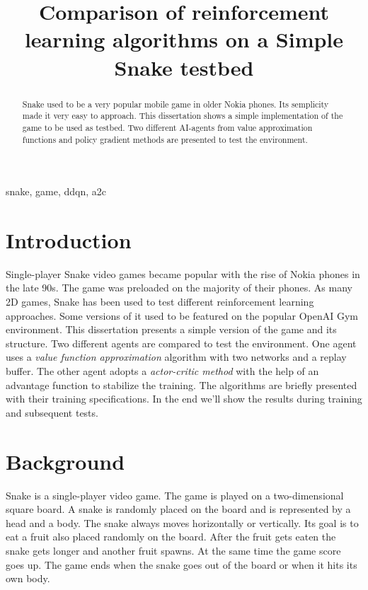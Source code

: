 \documentclass[conference]{IEEEtran}
\begin{document}
\title{Comparison of reinforcement learning algorithms on a Simple Snake testbed}

\author{
}

\maketitle

\begin{abstract}
Snake used to be a very popular mobile game in older Nokia phones. Its semplicity made it very easy to approach. This dissertation shows 
a simple implementation of the game to be used as testbed. Two different AI-agents from value approximation functions and policy gradient methods
are presented to test the environment.
\end{abstract}

\begin{IEEEkeywords}
snake, game, ddqn, a2c
\end{IEEEkeywords}

\section{Introduction}
Single-player Snake video games became popular with the rise of Nokia phones in the late 90s. 
The game was preloaded on the majority of their phones. As many 2D games, Snake has been used to test different reinforcement
learning approaches. Some versions of it used to be featured on the popular OpenAI Gym environment. 
This dissertation presents a simple version of the game and its structure. Two different agents are compared to test the environment.
One agent uses a \textit{value function approximation} algorithm with two networks and a replay buffer. The other agent adopts a \textit{actor-critic method} with 
the help of an advantage function to stabilize the training. The algorithms are briefly presented with their training specifications. In the end 
we'll show the results during training and subsequent tests.

\section{Background}
Snake is a single-player video game. The game is played on a two-dimensional square board. A snake is randomly placed on the board and is represented 
by a head and a body. The snake always moves horizontally or vertically. Its goal is to eat a fruit also placed randomly on the board. After the fruit gets
eaten the snake gets longer and another fruit spawns. At the same time the game score goes up. The game ends when the snake goes out of the board or when it hits
its own body.
\end{document}
